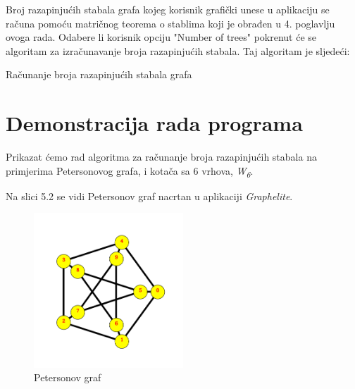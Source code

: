 \documentclass[times, utf8, zavrsni]{fer}
\begin{document}
Broj razapinjućih stabala grafa kojeg korisnik grafički unese u aplikaciju se računa pomoću matričnog teorema o stablima koji je obrađen u 4. poglavlju ovoga rada. Odabere li korisnik opciju "Number of trees" pokrenut će se algoritam za izračunavanje broja razapinjućih stabala. Taj algoritam je sljedeći:

\begin{algorithm}
	\caption{Računanje broja razapinjućih stabala grafa}
	\label{algo:spanning-trees}
	\begin{algorithmic}
						\ENDIF
					\ENDFOR
				\ELSE
				\ENDIF
			\ENDFOR
		\ENDFOR
	\end{algorithmic}
\end{algorithm}

\newpage

\section{Demonstracija rada programa}

Prikazat ćemo rad algoritma za računanje broja razapinjućih stabala na primjerima Petersonovog grafa, i kotača sa 6 vrhova, \textit{W\textsubscript{6}}.

Na slici 5.2 se vidi Petersonov graf nacrtan u aplikaciji \textit{Graphelite}.

\begin{figure}[htb]
	\centering
	\includegraphics[width=0.5\textwidth]{slike/petersonov.png}
	\caption{Petersonov graf}
	\label{fig:petersonov}
\end{figure}
\end{document}
